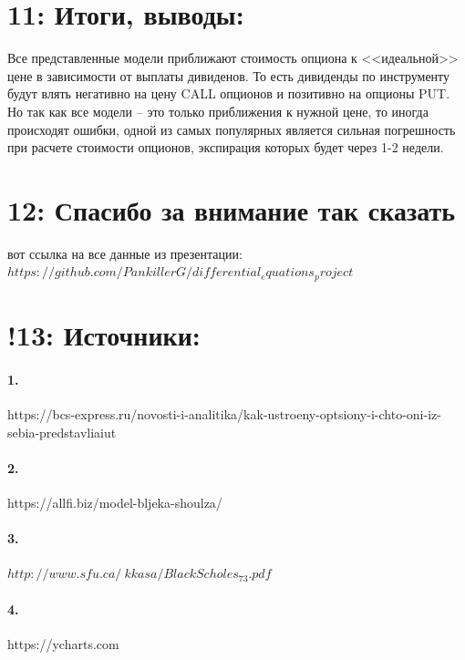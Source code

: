 \documentclass[a4paper]{article}
\begin{document}
\section*{11: Итоги, выводы:}
Все представленные модели приближают стоимость опциона к <<идеальной>> цене в зависимости от выплаты дивиденов. То есть дивиденды по инструменту будут влять негативно на цену CALL опционов и позитивно на опционы PUT.
Но так как все модели -- это только приближения к нужной цене, то иногда происходят ошибки, одной из самых популярных является сильная погрешность при расчете стоимости опционов, экспирация которых будет через 1-2 недели.

\section*{12: Спасибо за внимание так сказать}
вот ссылка на все данные из презентации: \\
$https://github.com/PankillerG/differential_equations_project$
\section*{!13: Источники:}
\paragraph*{1.}
https://bcs-express.ru/novosti-i-analitika/kak-ustroeny-optsiony-i-chto-oni-iz-sebia-predstavliaiut
\paragraph*{2.}
https://allfi.biz/model-bljeka-shoulza/
\paragraph*{3.}
$http://www.sfu.ca/~kkasa/BlackScholes_73.pdf$
\paragraph*{4.}
https://ycharts.com
\end{document}
